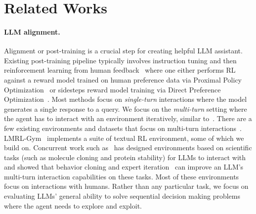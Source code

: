 \documentclass{article}
\theoremstyle{plain}
\theoremstyle{definition}
\theoremstyle{remark}
\begin{document}
\section{Related Works}
\paragraph{LLM alignment.} Alignment or post-training is a crucial step for creating helpful LLM assistant. Existing post-training pipeline typically involves instruction tuning and then reinforcement learning from human feedback~\citep[RLHF]{christiano2017deep} where one either performs RL against a reward model trained on human preference data via Proximal Policy Optimization~\citep[PPO]{schulman2017proximal} or sidesteps reward model training via Direct Preference Optimization~\citep[DPO]{rafailov2024direct}. Most methods focus on \textit{single-turn} interactions where the model generates a single response to a query. We focus on the \emph{multi-turn} setting where the agent has to interact with an environment iteratively, similar to~\citet{rafailov2024rqlanguagemodel}. There are a few existing environments and datasets that focus on multi-turn interactions~\citep{abdulhai2023lmrl, sun2023parrot, kwan2024mt, wang2024mint}. LMRL-Gym~\citep{abdulhai2023lmrl} implements a suite of textual RL environment, some of which we build on. Concurrent work such as~\citet{narayanan2024aviarytraininglanguageagents} has designed environments based on scientific tasks (such as molecule cloning and protein stability) for LLMs to interact with and showed that behavior cloning and expert iteration~\citep{anthony2017thinkingfastslowdeep,anthony2019policygradientsearchonline,havrilla2024teachinglargelanguagemodels} can improve an LLM's multi-turn interaction capabilities on these tasks. Most of these environments focus on interactions with humans. Rather than any particular task, we focus on evaluating LLMs' general ability to solve sequential decision making problems where the agent needs to explore and exploit.
\end{document}

